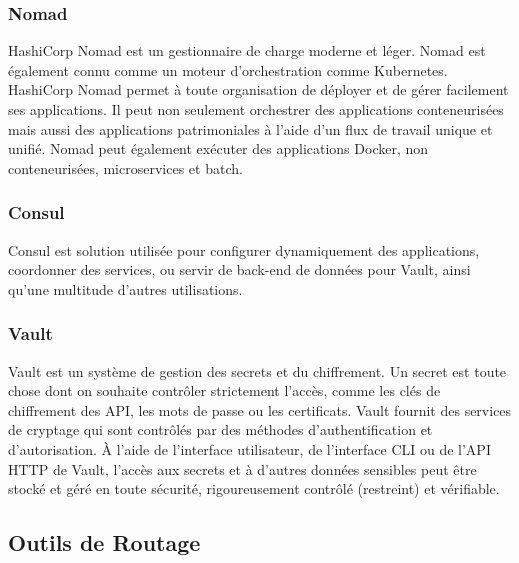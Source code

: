 \subsubsection*{Nomad}
HashiCorp Nomad est un gestionnaire de charge moderne et léger. Nomad est également
connu comme un moteur d’orchestration comme Kubernetes. HashiCorp Nomad permet à toute organisation de déployer et de gérer facilement ses applications. Il peut non seulement orchestrer des applications conteneurisées mais aussi des applications patrimoniales à l’aide d’un flux de travail unique et unifié. Nomad peut également exécuter des applications Docker, non conteneurisées, microservices et batch.

\subsubsection*{Consul}
Consul est solution utilisée pour configurer dynamiquement des applications, coordonner des services,
ou servir de back-end de données pour Vault, ainsi qu’une multitude d’autres utilisations.

\subsubsection*{Vault}
Vault est un système de gestion des secrets et du chiffrement. Un secret est toute chose
dont on souhaite contrôler strictement l’accès, comme les clés de chiffrement des API, les mots de passe ou les certificats. Vault fournit des services de cryptage qui sont contrôlés par des méthodes d’authentification et d’autorisation. À l’aide de l’interface utilisateur, de l’interface
CLI ou de l’API HTTP de Vault, l’accès aux secrets et à d’autres données sensibles peut être
stocké et géré en toute sécurité, rigoureusement contrôlé (restreint) et vérifiable.

\subsection{Outils de Routage}
